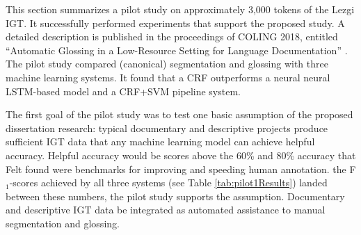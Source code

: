 This section summarizes a pilot study on approximately 3,000 tokens of the Lezgi IGT. It successfully performed experiments that support the proposed study. A detailed description is published in the proceedings of COLING 2018, entitled ``Automatic Glossing in a Low-Resource Setting for Language Documentation'' \cite{moeller_automatic_2018}. The pilot study compared (canonical) segmentation and glossing with three machine learning systems. It found that a CRF outperforms a neural neural LSTM-based model and a CRF+SVM pipeline system. 

The first goal of the pilot study was to test one basic assumption of the proposed dissertation research: typical documentary and descriptive projects produce sufficient IGT data that any machine learning model can achieve helpful accuracy. Helpful accuracy would be scores above the 60\% and 80\% accuracy that Felt \cite{felt_improving_2012} found were benchmarks for improving and speeding human annotation. 
the F$_1$-scores achieved by all three systems (see Table \ref{tab:pilot1Results}) landed between these numbers, the pilot study supports the assumption. Documentary and descriptive IGT data be integrated as automated assistance to manual segmentation and glossing. 

